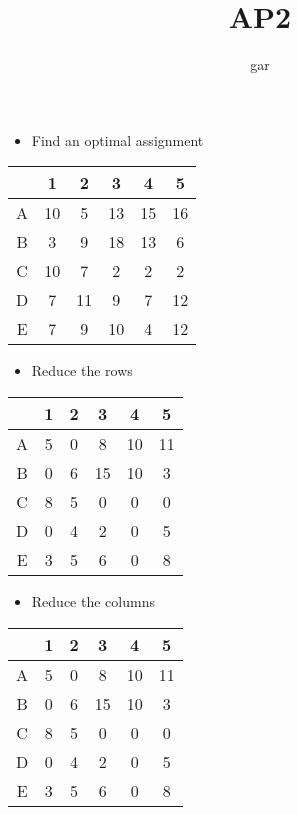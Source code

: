\documentclass[12pt]{beamer}
\title{AP2}
\author{gar}
\date{}
\begin{document}
\maketitle

\begin{frame}
\begin{itemize}
\item Find an optimal assignment
\end{itemize}
\begin{center}
\begin{tabular}{|c|ccccc|}
\hline
  & 1  & 2  & 3  & 4  & 5  \\
\hline
A & 10 & 5  & 13 & 15 & 16 \\
B & 3  & 9  & 18 & 13 & 6  \\
C & 10 & 7  & 2  & 2  & 2  \\
D & 7  & 11 & 9  & 7  & 12 \\
E & 7  & 9  & 10 & 4  & 12 \\
\hline
\end{tabular}
\end{center}
\end{frame}

\begin{frame}
\begin{itemize}
\item Reduce the rows
\end{itemize}
\begin{center}
\begin{tabular}{|c|ccccc|}
\hline
  & 1 & 2 & 3  & 4  & 5  \\
\hline
A & 5 & 0 & 8  & 10 & 11 \\
B & 0 & 6 & 15 & 10 & 3  \\
C & 8 & 5 & 0  & 0  & 0  \\
D & 0 & 4 & 2  & 0  & 5  \\
E & 3 & 5 & 6  & 0  & 8  \\
\hline
\end{tabular}
\end{center}
\end{frame}

\begin{frame}
\begin{itemize}
\item Reduce the columns
\end{itemize}
\begin{center}
\begin{tabular}{|c|ccccc|}
\hline
  & 1 & 2 & 3  & 4  & 5  \\
\hline
A & 5 & 0 & 8  & 10 & 11 \\
B & 0 & 6 & 15 & 10 & 3  \\
C & 8 & 5 & 0  & 0  & 0  \\
D & 0 & 4 & 2  & 0  & 5  \\
E & 3 & 5 & 6  & 0  & 8  \\
\hline
\end{tabular}
\end{center}
\end{frame}
\end{document}
